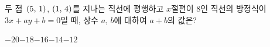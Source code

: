 두 점~$(5,\mkern3mu 1)$, $(1,\mkern3mu 4)$를 지나는 직선에 평행하고 $x$절편이 $8$인 직선의 방정식이 $3x+ay+b=0$일 때, 상수 $a$, $b$에 대하여 $a+b$의 값은?
\begin{choices32}{$-20$}{$-18$}{$-16$}{$-14$}{$-12$}\end{choices32}
